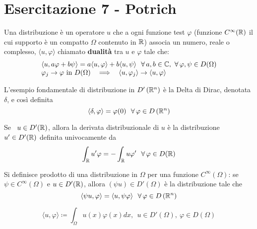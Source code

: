 \chapter{Esercitazione 7 - Potrich}
\ParteEsercizi
\begin{defn}
[Distribuzione] Una distribuzione è un operatore $u$ che a ogni funzione test $\varphi $ (funzione $C^{\infty }(\mathbb{R})$ il cui supporto è un compatto $\Omega $ contenuto in $\mathbb{R} $) associa un numero, reale o complesso, $\langle u,\varphi \rangle $ chiamato \textbf{dualità} tra $u$ e $\varphi $ tale che:
\begin{equation*}
\begin{array}{ l }
\langle u,a\varphi + b\psi \rangle = a\langle u,\varphi \rangle + b\langle u,\psi \rangle \ \ \forall a,b\in \CC  ,\ \forall \varphi ,\psi \in D(\Omega)\\
\varphi _{j}\rightarrow \varphi \ \text{in} \ D(\Omega) \ \ \implies \ \ \langle u,\varphi _{j} \rangle \rightarrow \langle u,\varphi \rangle 
\end{array}
\end{equation*}
\end{defn}
\begin{rem}
 L'esempio fondamentale di distribuzione in $D'\left(\mathbb{R} ^{n}\right)$ è la Delta di Dirac, denotata $\delta $, e così definita
\begin{equation*}
\langle \delta ,\varphi \rangle = \varphi (0) \ \ \forall \varphi \in D\left(\RR ^{n}\right)
\end{equation*}
\end{rem}
\begin{defn}
Se \ $u\in D'(\mathbb{R})$, allora la derivata distribuzionale di $u$ è la distribuzione $u'\in D'(\mathbb{R})$ definita univocamente da
\begin{equation*}
\int _{\RR } u'\varphi = - \int _{\RR } u\varphi '\ \ \forall \varphi \in D(\RR)
\end{equation*}
\end{defn}
\begin{defn}
Si definisce prodotto di una distribuzione in $\Omega $ per una funzione $C^{\infty }(\Omega)$: se $\psi \in C^{\infty }(\Omega)$ e $u\in D'(\mathbb{R})$, allora $(\psi u) \in D'(\Omega)$ è la distribuzione tale che
\begin{equation*}
\langle \psi u,\varphi \rangle = \langle u,\psi \varphi \rangle \ \ \forall \varphi \in D\left(\RR ^{n}\right)
\end{equation*}
\end{defn}
\begin{rem}
\begin{equation*}
\langle u,\varphi \rangle \coloneqq \int _{\Omega } u(x) \varphi (x) dx,\ \ u\in D'(\Omega) ,\ \varphi \in D(\Omega)
\end{equation*}
\end{rem}
\Esercizio{}


